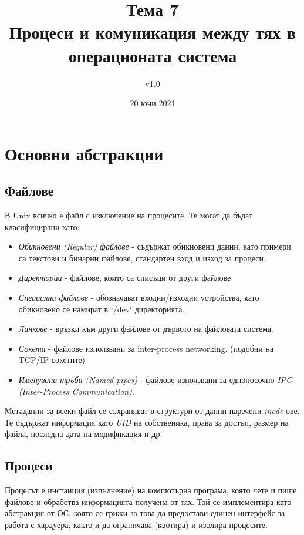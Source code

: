 \documentclass[fleqn,12pt]{article}
\title{Тема 7\\ Процеси и комуникация между тях в операционата система}
\author{v1.0}
\date{20 юни 2021}
\begin{document}
\maketitle

\tableofcontents
\pagebreak

\section{Основни абстракции}

\subsection{Файлове}

В Unix всичко е файл с изключение на процесите. Те могат да бъдат класифицирани като:
\begin{itemize}
    \item \textit{Обикновени (Regular) файлове} - съдържат обикновени данни, като примери са текстови и бинарни файлове, стандартен вход и изход за процеси.
    \item \textit{Директории} - файлове, които са списъци от други файлове
    \item \textit{Специални файлове} - обозначават входни/изходни устройства, като обикновено се намират в `/dev` директорията.
    \item \textit{Линкове} - връзки към други файлове от дървото на файловата система.
    \item \textit{Сокети} - файлове използвани за inter-process networking. (подобни на TCP/IP сокетите)
    \item \textit{Именувани тръби (Named pipes)} - файлове използвани за еднопосочно \textit{IPC (Inter-Process Communication)}.
\end{itemize}

Метаданни за всеки файл се съхраняват в структури от данни наречени \textit{inode}-ове.
Те съдържат информация като \textit{UID} на собственика, права за достъп, размер на файла, последна дата на модификация и др.

\subsection{Процеси}

Процесът е инстанция (изпълнение) на компютърна програма, която чете и пише файлове и обработва информацията получена от тях.
Той се имплементира като абстракция от ОС, която се грижи за това да предостави единен интерфейс за работа с хардуера, както и да ограничава (квотира) и изолира процесите.
\end{document}
